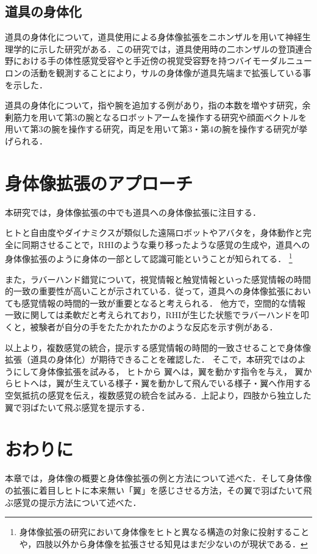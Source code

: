 \subsection{道具の身体化}
    道具の身体化について，道具使用による身体像拡張をニホンザルを用いて神経生理学的に示した研究がある\cite{iriki1996coding}．この研究では，道具使用時の二ホンザルの登頂連合野における手の体性感覚受容やと手近傍の視覚受容野を持つバイモーダルニューロンの活動を観測することにより，サルの身体像が道具先端まで拡張している事を示した．
   
    道具の身体化について，指や腕を追加する例があり，指の本数を増やす研究\cite{prattichizzo2014sixth}，余剰筋力を用いて第3の腕となるロボットアームを操作する研究\cite{iwadare2017thirdarm}\cite{岩垂真哉2016余剰筋力を用いた第三の腕ロボットの操縦}や顔面ベクトルを用いて第3の腕を操作する研究\cite{iwasaki2017research}，両足を用いて第3・第4の腕を操作する研究が挙げられる\cite{sasaki2017metalimbs}．
    

\section{身体像拡張のアプローチ} 
    本研究では，身体像拡張の中でも道具への身体像拡張に注目する．

    ヒトと自由度やダイナミクスが類似した遠隔ロボットやアバタを，身体動作と完全に同期させることで，RHIのような乗り移ったような感覚の生成や，道具への身体像拡張のように身体の一部として認識可能ということが知られてる．
    \footnote{身体像拡張の研究において身体像をヒトと異なる構造の対象に投射することや，四肢以外から身体像を拡張させる知見はまだ少ないのが現状である．}
    
    また，ラバーハンド錯覚について，視覚情報と触覚情報といった感覚情報の時間的一致の重要性が高いことが示されている\cite{本間元康2010ラバーハンドイリュージョン}\cite{ehrsson2007experimental}\cite{shimada2009rubber}．従って，道具への身体像拡張においても感覚情報の時間的一致が重要となると考えられる．
    他方で，空間的な情報一致に関しては柔軟だと考えられており，RHIが生じた状態でラバーハンドを叩くと，被験者が自分の手をたたかれたかのような反応を示す例がある\cite{armel2003projecting}．


    以上より，複数感覚の統合，提示する感覚情報の時間的一致させることで身体像拡張（道具の身体化）が期待できることを確認した．
    そこで，本研究ではのようにして身体像拡張を試みる，
    ヒトから
    翼へは，翼を動かす指令を与え，
    翼からヒトへは，翼が生えている様子・翼を動かして飛んでいる様子・翼へ作用する空気抵抗の感覚を伝え，複数感覚の統合を試みる．上記より，四肢から独立した翼で羽ばたいて飛ぶ感覚を提示する．

\section{おわりに}
    本章では，身体像の概要と身体像拡張の例と方法について述べた．そして身体像の拡張に着目しヒトに本来無い「翼」を感じさせる方法，その翼で羽ばたいて飛ぶ感覚の提示方法について述べた．
    
